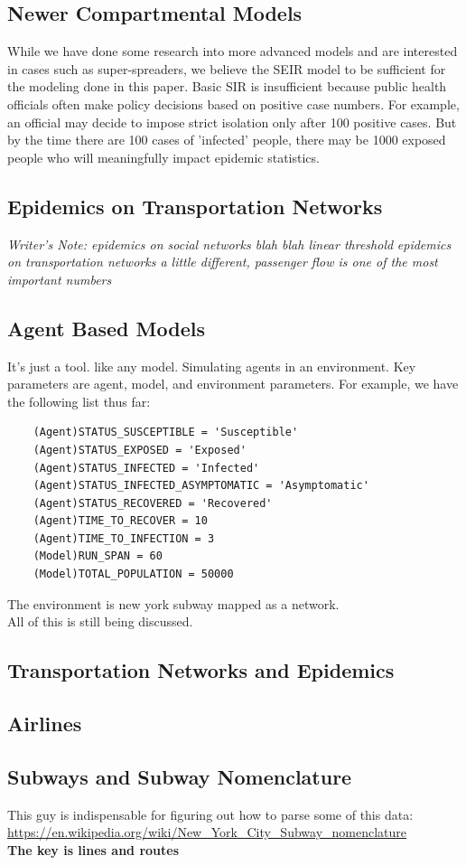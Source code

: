 \documentclass[12pt, a4, epsf] {article}
\theoremstyle{plain}
\theoremstyle{definition}
\begin{document}
\subsection*{Newer Compartmental Models}
While we have done some research into more advanced models and are interested in cases such as super-spreaders, we believe the SEIR model to be sufficient for the modeling done in this paper. Basic SIR is insufficient because public health officials often make policy decisions based on positive case numbers. For example, an official may decide to impose strict isolation only after 100 positive cases. But by the time there are 100 cases of 'infected' people, there may be 1000 exposed people who will meaningfully impact epidemic statistics.
\subsection*{Epidemics on Transportation Networks}
\textit{Writer's Note: epidemics on social networks blah blah linear threshold}
\textit{epidemics on transportation networks a little different, passenger flow is one of the most important numbers}
\subsection*{Agent Based Models}
It's just a tool. like any model. Simulating agents in an environment. Key parameters are agent, model, and environment parameters. For example, we have the following list thus far:\\
\begin{verbatim}
	(Agent)STATUS_SUSCEPTIBLE = 'Susceptible'
	(Agent)STATUS_EXPOSED = 'Exposed'
	(Agent)STATUS_INFECTED = 'Infected'
	(Agent)STATUS_INFECTED_ASYMPTOMATIC = 'Asymptomatic'
	(Agent)STATUS_RECOVERED = 'Recovered'
	(Agent)TIME_TO_RECOVER = 10
	(Agent)TIME_TO_INFECTION = 3
	(Model)RUN_SPAN = 60
	(Model)TOTAL_POPULATION = 50000
\end{verbatim}
The environment is new york subway mapped as a network.\\ 
All of this is still being discussed.\\
\subsection*{Transportation Networks and Epidemics}
\subsection*{Airlines}
\subsection*{Subways and Subway Nomenclature}
This guy is indispensable for figuring out how to parse some of this data:\\
\url{https://en.wikipedia.org/wiki/New_York_City_Subway_nomenclature}\\
\textbf{The key is lines and routes}\\
\end{document}
